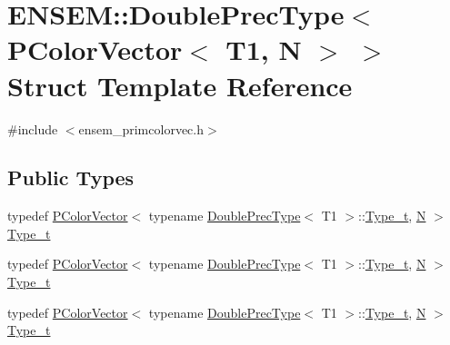 \hypertarget{structENSEM_1_1DoublePrecType_3_01PColorVector_3_01T1_00_01N_01_4_01_4}{}\section{E\+N\+S\+EM\+:\+:Double\+Prec\+Type$<$ P\+Color\+Vector$<$ T1, N $>$ $>$ Struct Template Reference}
\label{structENSEM_1_1DoublePrecType_3_01PColorVector_3_01T1_00_01N_01_4_01_4}


{\ttfamily \#include $<$ensem\+\_\+primcolorvec.\+h$>$}

\subsection*{Public Types}
\begin{DoxyCompactItemize}
\item 
typedef \mbox{\hyperlink{classENSEM_1_1PColorVector}{P\+Color\+Vector}}$<$ typename \mbox{\hyperlink{structENSEM_1_1DoublePrecType}{Double\+Prec\+Type}}$<$ T1 $>$\+::\mbox{\hyperlink{structENSEM_1_1DoublePrecType_3_01PColorVector_3_01T1_00_01N_01_4_01_4_af7639042ca77d3429dc5dc974ef5c87d}{Type\+\_\+t}}, \mbox{\hyperlink{adat__devel_2lib_2hadron_2operator__name__util_8cc_a7722c8ecbb62d99aee7ce68b1752f337}{N}} $>$ \mbox{\hyperlink{structENSEM_1_1DoublePrecType_3_01PColorVector_3_01T1_00_01N_01_4_01_4_af7639042ca77d3429dc5dc974ef5c87d}{Type\+\_\+t}}
\item 
typedef \mbox{\hyperlink{classENSEM_1_1PColorVector}{P\+Color\+Vector}}$<$ typename \mbox{\hyperlink{structENSEM_1_1DoublePrecType}{Double\+Prec\+Type}}$<$ T1 $>$\+::\mbox{\hyperlink{structENSEM_1_1DoublePrecType_3_01PColorVector_3_01T1_00_01N_01_4_01_4_af7639042ca77d3429dc5dc974ef5c87d}{Type\+\_\+t}}, \mbox{\hyperlink{adat__devel_2lib_2hadron_2operator__name__util_8cc_a7722c8ecbb62d99aee7ce68b1752f337}{N}} $>$ \mbox{\hyperlink{structENSEM_1_1DoublePrecType_3_01PColorVector_3_01T1_00_01N_01_4_01_4_af7639042ca77d3429dc5dc974ef5c87d}{Type\+\_\+t}}
\item 
typedef \mbox{\hyperlink{classENSEM_1_1PColorVector}{P\+Color\+Vector}}$<$ typename \mbox{\hyperlink{structENSEM_1_1DoublePrecType}{Double\+Prec\+Type}}$<$ T1 $>$\+::\mbox{\hyperlink{structENSEM_1_1DoublePrecType_3_01PColorVector_3_01T1_00_01N_01_4_01_4_af7639042ca77d3429dc5dc974ef5c87d}{Type\+\_\+t}}, \mbox{\hyperlink{adat__devel_2lib_2hadron_2operator__name__util_8cc_a7722c8ecbb62d99aee7ce68b1752f337}{N}} $>$ \mbox{\hyperlink{structENSEM_1_1DoublePrecType_3_01PColorVector_3_01T1_00_01N_01_4_01_4_af7639042ca77d3429dc5dc974ef5c87d}{Type\+\_\+t}}
\end{DoxyCompactItemize}


